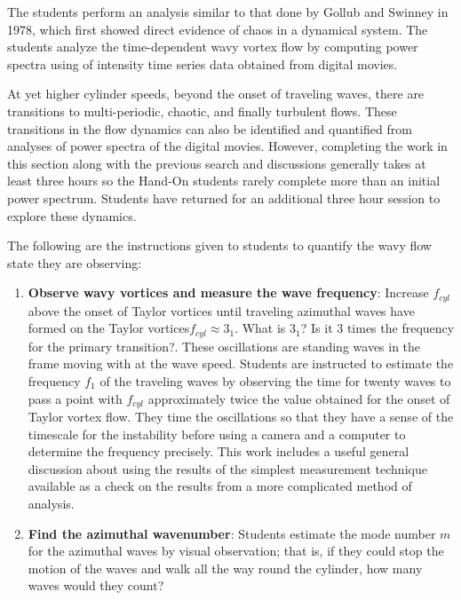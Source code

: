 \documentclass[%
reprint,
 amsmath,amssymb,
 aps,
prb,
floatfix,
longbibliography,
notitlepage
]{revtex4-1}
\newcommand{\DB}[1]{{\color{red}#1}} %
\begin{document}
 The students perform an analysis similar to that done by Gollub and Swinney in 1978,\cite{gollub_swinney_1978} which first showed direct evidence of chaos in a dynamical system. The students analyze the time-dependent wavy vortex flow by computing power spectra using of intensity time series data obtained from digital movies.  

At yet higher cylinder speeds, beyond the onset of traveling waves, there are transitions to multi-periodic, chaotic, and finally turbulent flows.  These transitions in the flow dynamics can also be identified and quantified from analyses of  power spectra of the digital movies. However, completing the work in this section along with the previous search and discussions generally takes at least three hours so the Hand-On students rarely complete more than an initial power spectrum. Students have returned for an additional three hour session to explore these dynamics.

The following are the instructions given to students to quantify the wavy flow state they are observing:

\begin{enumerate}
\item {\bf Observe wavy vortices and measure the wave frequency}: Increase $f_{cyl}$ above the onset of Taylor vortices until traveling azimuthal waves have formed on the Taylor vortices$f_{cyl}\approx 3_1$. \DB{What is $3_1$? Is it 3 times the frequency for the primary transition?}. These oscillations are standing waves in the frame moving with at the wave speed. Students are instructed to estimate the frequency $f_1$ of the traveling waves by observing the time for twenty waves to pass a point with $f_{cyl}$ approximately twice the value obtained for the onset of Taylor vortex flow. They time the oscillations so that they have a sense of the timescale for the instability before using a camera and a computer to determine the frequency precisely. This work includes a useful general discussion about using the results of the simplest measurement technique available as a check on the results from a more complicated method of analysis.

\item {\bf Find the azimuthal wavenumber}:  Students estimate  the mode number $m$ for the azimuthal waves by visual observation; that is, if they could stop the motion of the waves and walk all the way round the cylinder, how many waves would they count?

\end{enumerate}
\end{document}
